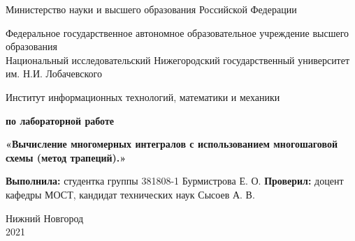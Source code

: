 \documentclass{report}
\begin{document}
	
	\begin{titlepage}
		
		\begin{center}
			Министерство науки и высшего образования Российской Федерации
		\end{center}
		
		\begin{center}
			Федеральное государственное автономное образовательное учреждение высшего образования \\
			Национальный исследовательский Нижегородский государственный университет им. Н.И. Лобачевского
		\end{center}
		
		\begin{center}
			Институт информационных технологий, математики и механики
		\end{center}
		
		\vspace{4em}
		
		\begin{center}
			\textbf{ по лабораторной работе} \\
		\end{center}
		\begin{center}
			\textbf{\Large«Вычисление многомерных интегралов с использованием многошаговой схемы (метод трапеций).»} \\
		\end{center}
		
		\vspace{4em}
		
		\newbox{\lbox}
		\newlength{\maxl}
		\setlength{\maxl}{\wd\lbox}
		\hfill\parbox{7cm}{
			\hspace*{5cm}\hspace*{-5cm}\textbf{Выполнила:} 
			\newline студентка группы 381808-1 
			\newline Бурмистрова Е. О.
			\newline
			\newline
			\hspace*{5cm}\hspace*{-5cm}\textbf{Проверил:}
			\newline доцент кафедры МОСТ, 
			\newline кандидат технических наук 
			\newline Сысоев А. В.
		}
		\vspace{\fill}
		
		\begin{center} Нижний Новгород \\ 2021 \end{center}
		
	\end{titlepage}
		\setcounter{page}{2}
	
\end{document}
